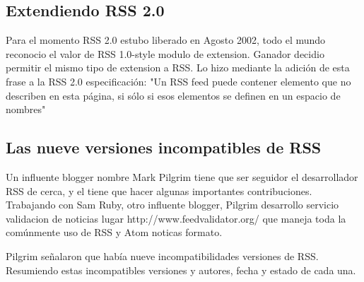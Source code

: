 \subsection{Extendiendo RSS 2.0}

Para el momento RSS 2.0 estubo liberado en Agosto 2002, todo el mundo reconocio el valor de RSS 1.0-style 
modulo de extension. Ganador decidio permitir el mismo tipo de extension a RSS. Lo hizo mediante la adición
de esta frase a la RSS 2.0 especificación: "Un RSS feed puede contener elemento que no describen en esta página,
si sólo si esos elementos se definen en un espacio de nombres"

\subsection{Las nueve versiones incompatibles de RSS}

Un influente blogger nombre Mark Pilgrim tiene que ser seguidor el desarrollador RSS de cerca, y el tiene que hacer
algunas importantes contribuciones. Trabajando con Sam Ruby, otro influente blogger, Pilgrim desarrollo servicio validacion de noticias lugar http://www.feedvalidator.org/ que maneja toda la comúnmente uso de RSS y Atom noticas
formato. 

Pilgrim señalaron que había nueve incompatibilidades versiones de RSS. Resumiendo estas incompatibles versiones y
autores, fecha y estado de cada una.

